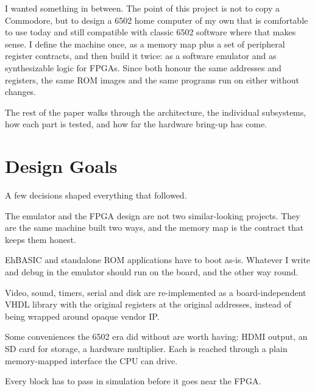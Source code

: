 \documentclass[11pt,a4paper]{article}
\begin{document}
I wanted something in between. The point of this project is not to copy a
Commodore, but to design a 6502 home computer of my own that is
comfortable to use today and still compatible with classic 6502 software
where that makes sense. I define the machine once, as a memory map plus a
set of peripheral register contracts, and then build it twice: as a
software emulator and as synthesizable logic for FPGAs. Since both honour
the same addresses and registers, the same ROM images and the same
programs run on either without changes.

The rest of the paper walks through the architecture, the individual
subsystems, how each part is tested, and how far the hardware bring-up
has come.

\section{Design Goals}

A few decisions shaped everything that followed.

\begin{description}[leftmargin=1.4em,style=nextline,itemsep=0.3em]
  \item[\color{accent2}One machine, two implementations.]
  The emulator and the FPGA design are not two similar-looking projects.
  They are the same machine built two ways, and the memory map is the
  contract that keeps them honest.

  \item[\color{accent2}Run unmodified 6502 software.]
  EhBASIC and standalone ROM applications have to boot as-is. Whatever I
  write and debug in the emulator should run on the board, and the other
  way round.

  \item[\color{accent2}Write the chips in RTL.]
  Video, sound, timers, serial and disk are re-implemented as a
  board-independent VHDL library with the original registers at the
  original addresses, instead of being wrapped around opaque vendor IP.

  \item[\color{accent2}Be modern where it actually helps.]
  Some conveniences the 6502 era did without are worth having: HDMI
  output, an SD card for storage, a hardware multiplier. Each is reached
  through a plain memory-mapped interface the CPU can drive.

  \item[\color{accent2}Test before trusting.]
  Every block has to pass in simulation before it goes near the FPGA.
\end{description}
\end{document}

